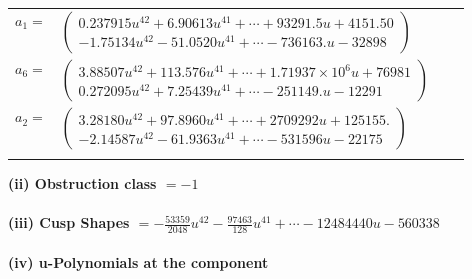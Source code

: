 \documentclass[1p]{elsarticle_modified}
\theoremstyle{definition}
\begin{document}
\begin{tabular}{m{7pt} m{180pt} m{7pt} m{180pt} }
\flushright $a_{1}=$&$\begin{pmatrix}0.237915 u^{42}+6.90613 u^{41}+\cdots+93291.5 u+4151.50\\-1.75134 u^{42}-51.0520 u^{41}+\cdots-736163. u-32898\end{pmatrix}$ \\
\flushright $a_{6}=$&$\begin{pmatrix}3.88507 u^{42}+113.576 u^{41}+\cdots+1.71937\times10^{6} u+76981\\0.272095 u^{42}+7.25439 u^{41}+\cdots-251149. u-12291\end{pmatrix}$ \\
\flushright $a_{2}=$&$\begin{pmatrix}3.28180 u^{42}+97.8960 u^{41}+\cdots+2709292 u+125155.\\-2.14587 u^{42}-61.9363 u^{41}+\cdots-531596 u-22175\end{pmatrix}$\\&\end{tabular}
\flushleft \textbf{(ii) Obstruction class $= -1$}\\~\\
\flushleft \textbf{(iii) Cusp Shapes $= -\frac{53359}{2048} u^{42}-\frac{97463}{128} u^{41}+\cdots-12484440 u-560338$}\\~\\
\newpage\renewcommand{\arraystretch}{1}
\flushleft \textbf{(iv) u-Polynomials at the component}\newline \\
\end{document}
